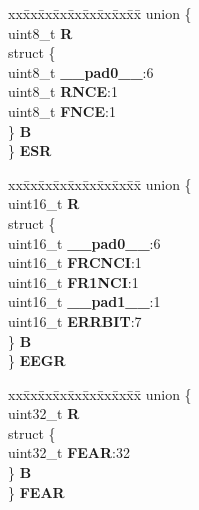 \begin{DoxyCompactItemize}
\begin{tabbing}
\end{tabbing}\item 
\mbox{\label{structECSM__tag_aab5edd9480e73092fe7d8f2960093640}} 
\begin{tabbing}
xx\=xx\=xx\=xx\=xx\=xx\=xx\=xx\=xx\=\kill
union \{\\
\>uint8\_t {\bfseries R}\\
\>struct \{\\
\>\>uint8\_t {\bfseries \_\_pad0\_\_}:6\\
\>\>uint8\_t {\bfseries RNCE}:1\\
\>\>uint8\_t {\bfseries FNCE}:1\\
\>\} {\bfseries B}\\
\} {\bfseries ESR}\\

\end{tabbing}\item 
\mbox{\label{structECSM__tag_a04d668b1fb6b785cd909f1f5039137cf}} 
\begin{tabbing}
xx\=xx\=xx\=xx\=xx\=xx\=xx\=xx\=xx\=\kill
union \{\\
\>uint16\_t {\bfseries R}\\
\>struct \{\\
\>\>uint16\_t {\bfseries \_\_pad0\_\_}:6\\
\>\>uint16\_t {\bfseries FRCNCI}:1\\
\>\>uint16\_t {\bfseries FR1NCI}:1\\
\>\>uint16\_t {\bfseries \_\_pad1\_\_}:1\\
\>\>uint16\_t {\bfseries ERRBIT}:7\\
\>\} {\bfseries B}\\
\} {\bfseries EEGR}\\

\end{tabbing}\item 
\mbox{\label{structECSM__tag_a89753bf1671895ed599ba7a22677ee73}} 
\begin{tabbing}
xx\=xx\=xx\=xx\=xx\=xx\=xx\=xx\=xx\=\kill
union \{\\
\>uint32\_t {\bfseries R}\\
\>struct \{\\
\>\>uint32\_t {\bfseries FEAR}:32\\
\>\} {\bfseries B}\\
\} {\bfseries FEAR}\\


\end{tabbing}
\end{DoxyCompactItemize}
